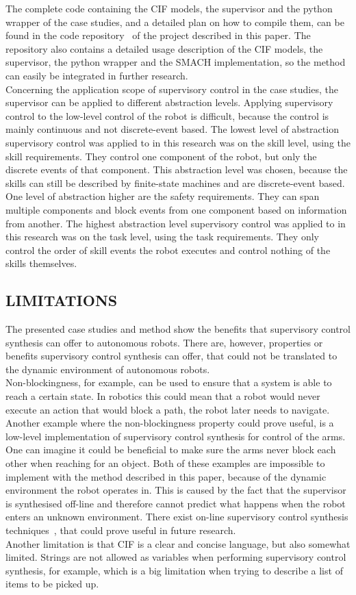 The complete code containing the CIF models, the supervisor and the python wrapper of the case studies, and a detailed plan on how to compile them, can be found in the code repository~\cite{jorrit_github} of the project described in this paper.
The repository also contains a detailed usage description of the CIF models, the supervisor, the python wrapper and the SMACH implementation, so the method can easily be integrated in further research.\\

Concerning the application scope of supervisory control in the case studies, the supervisor can be applied to different abstraction levels.
Applying supervisory control to the low-level control of the robot is difficult, because the control is mainly continuous and not discrete-event based.
The lowest level of abstraction supervisory control was applied to in this research was on the skill level, using the skill requirements. 
They control one component of the robot, but only the discrete events of that component.
This abstraction level was chosen, because the skills can still be described by finite-state machines and are discrete-event based.
One level of abstraction higher are the safety requirements. 
They can span multiple components and block events from one component based on information from another. 
The highest abstraction level supervisory control was applied to in this research was on the task level, using the task requirements.
They only control the order of skill events the robot executes and control nothing of the skills themselves.\\

\subsection{LIMITATIONS}
The presented case studies and method show the benefits that supervisory control synthesis can offer to autonomous robots.
There are, however, properties or benefits supervisory control synthesis can offer, that could not be translated to the dynamic environment of autonomous robots.\\

Non-blockingness, for example, can be used to ensure that a system is able to reach a certain state.
In robotics this could mean that a robot would never execute an action that would block a path, the robot later needs to navigate.
Another example where the non-blockingness property could prove useful, is a low-level implementation of supervisory control synthesis for control of the arms.
One can imagine it could be beneficial to make sure the arms never block each other when reaching for an object.
Both of these examples are impossible to implement with the method described in this paper, because of the dynamic environment the robot operates in.
This is caused by the fact that the supervisor is synthesised off-line and therefore cannot predict what happens when the robot enters an unknown environment.
There exist on-line supervisory control synthesis techniques~\cite{online_partially_observed,online_near_optimal,online_sup_rep_obs_sub}, that could prove useful in future research.\\

Another limitation is that CIF is a clear and concise language, but also somewhat limited.
Strings are not allowed as variables when performing supervisory control synthesis, for example, which is a big limitation when trying to describe a list of items to be picked up.\\